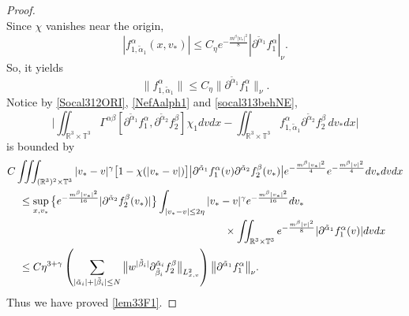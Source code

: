\documentclass[reqno]{amsart}
\numberwithin{equation}{section}
\numberwithin{equation}{section}
\begin{document}
\begin{proof}
\begin{equation*}
			\end{equation*}
			Since $\chi$ vanishes near the origin,
			\begin{equation*}
				|f^{\alpha}_{1,\tilde{\alpha}_1}(x,v_*)| \le C_\eta e^{-\frac{m^{\beta}|v_*|^2}{8}} |\partial^{\tilde{\alpha}_1}f^{\alpha}_1|_{\nu} .
			\end{equation*}
			So, it yields 
			\begin{equation}\label{socal313behNE}
				\|f^{\alpha}_{1,\tilde{\alpha}_1}\| \le C_\eta \| \partial^{\tilde{\alpha}_1}f^{\alpha}_1\|_{\nu}.
			\end{equation}
			Notice by \eqref{Socal312ORI}, \eqref{NefAalph1} and \eqref{socal313behNE},
			\begin{equation*}
				\Big|\iint_{\mathbb{R}^3\times\mathbb{T}^3} \Gamma^{\alpha \beta} [\partial^{\tilde{\alpha}_1}f^{\alpha}_1, \partial^{\tilde{\alpha}_2}f^{\beta}_2] \chi_1 dv dx -\iint_{\mathbb{R}^3\times\mathbb{T}^3} f^{\alpha}_{1,\tilde{\alpha}_1} \partial^{\tilde{\alpha}_2}f^{\beta}_2\, dv_*dx\Big|
			\end{equation*}
			is bounded by
			\begin{align*}
			&C \iiint_{(\mathbb{R}^3)^2\times\mathbb{T}^3} |v_* - v|^\gamma \big[1 - \chi(|v_* - v|)\big] \big|\partial^{\tilde{\alpha}_1}f^{\alpha}_1(v) \partial^{\tilde{\alpha}_2}f^{\beta}_2(v_*)\big|e^{-\frac{m^{\beta}|v_*|^2}{4}}e^{-\frac{m^{\beta}|v|^2}{4}} dv_* dv dx\\
			&\hspace{0.4cm}\leq \sup_{x,v_*}\big\{e^{-\frac{m^{\beta}|v_*|^2}{16}}|\partial^{\tilde{\alpha}_2}f^{\beta}_2(v_*)|\big\} \int_{|v_* - v| \leq 2\eta} |v_*- v|^\gamma e^{-\frac{m^{\beta}|v_*|^2}{16}} dv_*\\
			&\hspace{7.3cm}\times \iint_{\mathbb{R}^3\times\mathbb{T}^3} e^{-\frac{m^{\beta}|v|^2}{8}}|\partial^{\tilde{\alpha}_1}f^{\alpha}_1(v)| dv dx\\
			&\hspace{0.4cm}\leq C\eta^{3 + \gamma} \left( \sum_{| \tilde{\alpha}_i |+| \tilde{\beta}_i | \le N} \big\| w^{| \tilde{\beta}_i |} \partial_{\tilde{\beta}_i}^{\tilde{\alpha}_i}f^{\beta}_2 \big\|_{L^{2}_{x,v}} \right) \big\| \partial^{\tilde{\alpha}_1}f^{\alpha}_1 \big\|_{\nu}.
			\end{align*}
			Thus we have proved \eqref{lem33F1}.
			

\end{proof}
\end{document}
